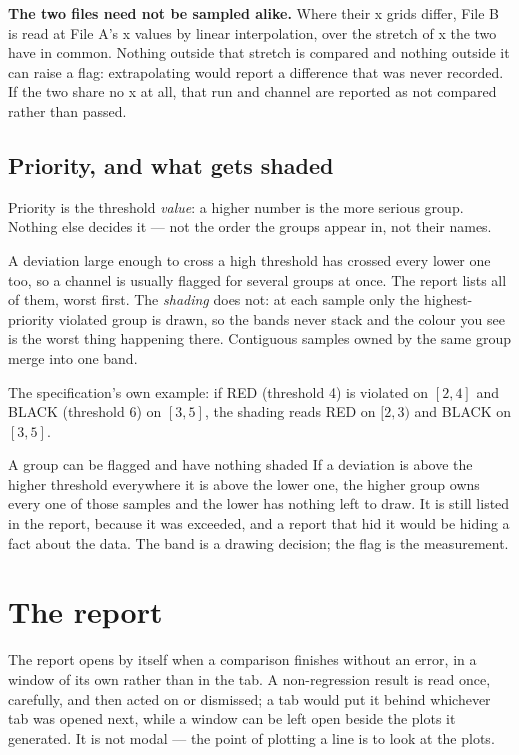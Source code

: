 \documentclass[11pt,a4paper,oneside]{report}
\begin{document}
\textbf{The two files need not be sampled alike.} Where their x grids differ,
File B is read at File A's x values by linear interpolation, over the stretch
of x the two have in common. Nothing outside that stretch is compared and
nothing outside it can raise a flag: extrapolating would report a difference
that was never recorded. If the two share no x at all, that run and channel are
reported as not compared rather than passed.

\subsection{Priority, and what gets shaded}
\label{sec:diffpriority}

Priority is the threshold \emph{value}: a higher number is the more serious
group. Nothing else decides it --- not the order the groups appear in, not
their names.

A deviation large enough to cross a high threshold has crossed every lower one
too, so a channel is usually flagged for several groups at once. The report
lists all of them, worst first. The \emph{shading} does not: at each sample
only the highest-priority violated group is drawn, so the bands never stack and
the colour you see is the worst thing happening there. Contiguous samples owned
by the same group merge into one band.

The specification's own example: if RED (threshold 4) is violated on $[2,4]$
and BLACK (threshold 6) on $[3,5]$, the shading reads RED on $[2,3)$ and BLACK
on $[3,5]$.

\begin{aoenote}{A group can be flagged and have nothing shaded}
If a deviation is above the higher threshold everywhere it is above the lower
one, the higher group owns every one of those samples and the lower has nothing
left to draw. It is still listed in the report, because it was exceeded, and a
report that hid it would be hiding a fact about the data. The band is a drawing
decision; the flag is the measurement.
\end{aoenote}

\section{The report}
\label{sec:diffreport}

The report opens by itself when a comparison finishes without an error, in a
window of its own rather than in the tab. A non-regression result is read once,
carefully, and then acted on or dismissed; a tab would put it behind whichever
tab was opened next, while a window can be left open beside the plots it
generated. It is not modal --- the point of plotting a line is to look at the
plots.
\end{document}

